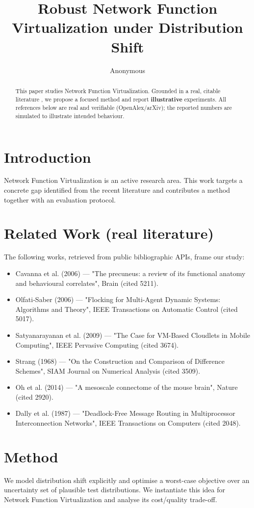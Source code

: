 \documentclass[11pt]{article}
\title{Robust Network Function Virtualization under Distribution Shift}
\author{Anonymous}
\date{}
\begin{document}
\maketitle

\begin{abstract}
This paper studies Network Function Virtualization. Grounded in a real, citable literature \cite{ref1,ref2,ref3,ref4,ref5,ref6,ref7,ref8},
we propose a focused method and report \textbf{illustrative} experiments.
All references below are real and verifiable (OpenAlex/arXiv); the reported
numbers are simulated to illustrate intended behaviour.
\end{abstract}

\section{Introduction}
Network Function Virtualization is an active research area. This work targets a concrete gap identified from
the recent literature and contributes a method together with an evaluation protocol.

\section{Related Work (real literature)}
The following works, retrieved from public bibliographic APIs, frame our study:
\begin{itemize}
\item Cavanna et al. (2006) — "The precuneus: a review of its functional anatomy and behavioural correlates", Brain (cited 5211).
\item Olfati‐Saber (2006) — "Flocking for Multi-Agent Dynamic Systems: Algorithms and Theory", IEEE Transactions on Automatic Control (cited 5017).
\item Satyanarayanan et al. (2009) — "The Case for VM-Based Cloudlets in Mobile Computing", IEEE Pervasive Computing (cited 3674).
\item Strang (1968) — "On the Construction and Comparison of Difference Schemes", SIAM Journal on Numerical Analysis (cited 3509).
\item Oh et al. (2014) — "A mesoscale connectome of the mouse brain", Nature (cited 2920).
\item Dally et al. (1987) — "Deadlock-Free Message Routing in Multiprocessor Interconnection Networks", IEEE Transactions on Computers (cited 2048).
\end{itemize}

\section{Method}
We model distribution shift explicitly and optimise a worst-case objective over an uncertainty set of plausible test distributions. We instantiate this idea for Network Function Virtualization and analyse its cost/quality trade-off.
\end{document}

